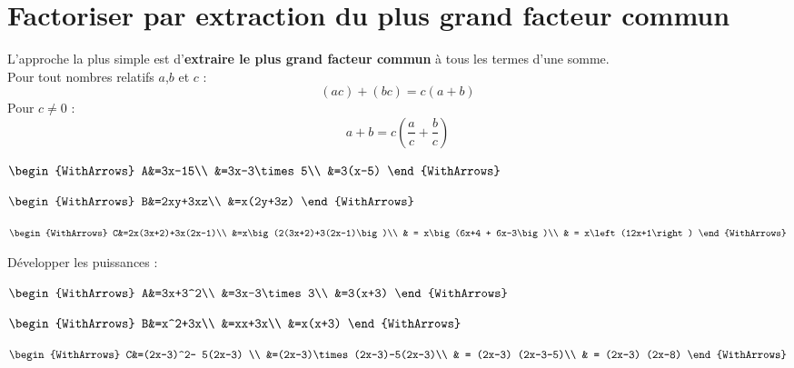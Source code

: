 \documentclass[main.tex]{subfiles}
\begin{document}
\section{Factoriser  par extraction du plus grand facteur commun}
\noindent  L'approche la plus simple est d'\textbf{extraire le plus grand facteur commun} à tous les termes d'une somme.
\\
Pour tout nombres relatifs $a$,$b$ et $c$ :  
\setlength{\abovedisplayskip}{3pt}
\setlength{\belowdisplayskip}{3pt}
$$ 	   (a c)+(b c)   =c(a+b) 	$$ 
Pour $c\neq 0$ :
\setlength{\abovedisplayskip}{3pt}
\setlength{\belowdisplayskip}{3pt}
$$ 	   a+b = c\left(\frac{a}{c}+\frac{b}{c}\right)	$$  
\begin{example}\hfill 
	
	\noindent
	\parbox{0.3\linewidth}{
		$\begin{WithArrows}
			A&=3x-15\\
			&=3x-3\times 5\\
			&=3(x-5)
		\end{WithArrows}$
	}\parbox{0.3\linewidth}{
		$\begin{WithArrows}
			B&=2xy+3xz\\
			&=x(2y+3z)
		\end{WithArrows}$
	}\parbox{0.3\linewidth}{
		$\begin{WithArrows}
			C&=2x(3x+2)+3x(2x-1)\\
			&=x\big(2(3x+2)+3(2x-1)\big)\\
			& = x\big(6x+4 + 6x-3\big)\\
			& = x\left(12x+1\right)
		\end{WithArrows}$
	}	 
\end{example}
\begin{example}[Puissances] Développer les puissances :
	
	\noindent
	\parbox{0.3\linewidth}{
		$\begin{WithArrows}
			A&=3x+3^2\\
			&=3x-3\times 3\\
			&=3(x+3)
		\end{WithArrows}$
	}\parbox{0.3\linewidth}{
		$\begin{WithArrows}
			B&=x^2+3x\\
			&=xx+3x\\
			&=x(x+3)
		\end{WithArrows}$
	}\parbox{0.3\linewidth}{
		$\begin{WithArrows}
			C&=(2x-3)^2- 5(2x-3) \\
			&=(2x-3)\times(2x-3)-5(2x-3)\\
			& = (2x-3) (2x-3-5)\\
			& = (2x-3) (2x-8)
		\end{WithArrows}$
	}		  
\end{example}
\end{document}
